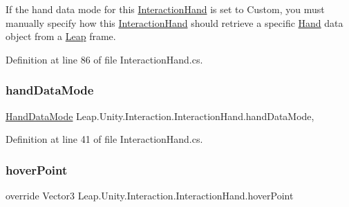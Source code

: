 If the hand data mode for this \mbox{\hyperlink{class_leap_1_1_unity_1_1_interaction_1_1_interaction_hand}{Interaction\+Hand}} is set to Custom, you must manually specify how this \mbox{\hyperlink{class_leap_1_1_unity_1_1_interaction_1_1_interaction_hand}{Interaction\+Hand}} should retrieve a specific \mbox{\hyperlink{class_leap_1_1_hand}{Hand}} data object from a \mbox{\hyperlink{namespace_leap_1_1_unity_1_1_leap}{Leap}} frame. 



Definition at line 86 of file Interaction\+Hand.\+cs.

\mbox{\label{class_leap_1_1_unity_1_1_interaction_1_1_interaction_hand_afa891e4ad766e5470dc8fdf0e78a7334}} 
\subsubsection{\texorpdfstring{handDataMode}{handDataMode}}
{\footnotesize\ttfamily \mbox{\hyperlink{namespace_leap_1_1_unity_1_1_interaction_ab4a739b7f8a6748903e2ccc029df7a50}{Hand\+Data\+Mode}} Leap.\+Unity.\+Interaction.\+Interaction\+Hand.\+hand\+Data\+Mode\hspace{0.3cm}{\ttfamily [get]}, {\ttfamily [set]}}



Definition at line 41 of file Interaction\+Hand.\+cs.

\mbox{\label{class_leap_1_1_unity_1_1_interaction_1_1_interaction_hand_a0f241a7ebea2f55c68666273fe5eda39}} 
\subsubsection{\texorpdfstring{hoverPoint}{hoverPoint}}
{\footnotesize\ttfamily override Vector3 Leap.\+Unity.\+Interaction.\+Interaction\+Hand.\+hover\+Point\hspace{0.3cm}{\ttfamily [get]}}



